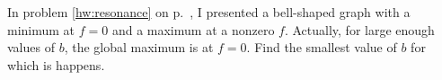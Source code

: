 In problem \ref{hw:resonance} on p.~\pageref{hw:resonance}, I presented a bell-shaped
graph with a minimum at $f=0$ and a maximum at a nonzero $f$. Actually, for large enough values of $b$, the
global maximum is at $f=0$. Find the smallest value of $b$ for which is happens.\answercheck
